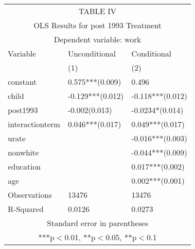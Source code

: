\begin{tabular}[H]{ |p{4cm}p{4cm}p{4cm}|}
 \hline
 \multicolumn{3}{|c|}{TABLE IV} \\
 \multicolumn{3}{|c|}{OLS Results for post 1993 Treatment} \\
 \hline
 \multicolumn{3}{|c|}{Dependent variable: work} \\
 \hline
   Variable &Unconditional & Conditional\\
  & (1) & (2) \\

constant& 0.575***(0.009)&0.496\\
child&-0.129***(0.012)&-0.118***(0.012)\\
post1993&-0.002(0.013)&-0.0234*(0.014)\\
interactionterm& 0.046***(0.017)&0.049***(0.017)\\
urate&&-0.016***(0.003)\\
nonwhite&&-0.044***(0.009)\\
education&&0.017***(0.002)\\
age&&0.002***(0.001)\\
Observations&13476&13476\\
R-Squared&0.0126&0.0273\\
\hline
\multicolumn{3}{c}{Standard error in parentheses} \\
\multicolumn{3}{c}{***p$<$0.01, **p$<$0.05, **p$<$0.1} \\

\end{tabular}

